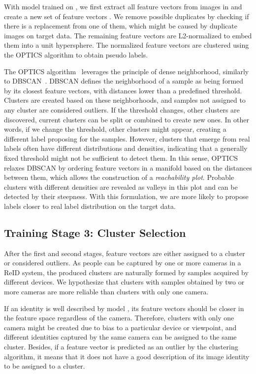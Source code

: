 \documentclass[journal]{IEEEtran}
\begin{document}
With model  trained on , we first extract all feature vectors from images in  and create a new set of feature vectors .
We remove possible duplicates by checking if there is a replacement from one of them, which might be caused by duplicate images on target data. The remaining feature vectors are L2-normalized to embed them into a unit hypersphere. The normalized feature vectors are clustered using the OPTICS algorithm to obtain pseudo labels. 

The OPTICS algorithm~\cite{ankerst1999optics} leverages the principle of dense neighborhood, similarly to DBSCAN~\cite{ester1996density}. DBSCAN defines the neighborhood of a sample as being formed by its closest feature vectors, with distances lower than a predefined threshold. Clusters are created based on these neighborhoods, and samples not assigned to any cluster are considered outliers. If the threshold changes, other clusters are discovered, current clusters can be split or combined to create new ones.  In other words, if we change the threshold, other clusters might appear, creating a different label proposing for the samples. However, clusters that emerge from real labels often have different distributions and densities, indicating that a generally fixed threshold might not be sufficient to detect them. In this sense, OPTICS relaxes DBSCAN by ordering feature vectors in a manifold based on the distances between them, which allows the construction of a \textit{reachability plot}. Probable clusters with different densities are revealed as valleys in this plot and can be detected by their steepness. With this formulation, we are more likely to propose labels closer to real label distribution on the target data.



\subsection{Training Stage 3: Cluster Selection}
\label{subsec:cluster_selection}

After the first and second stages, feature vectors are either assigned to a cluster or considered outliers. As people can be captured by one or more cameras in a ReID system, the produced clusters are naturally formed by samples acquired by different devices. We hypothesize that clusters with samples obtained by two or more cameras are more reliable than clusters with only one camera. 

If an identity is well described by model , its feature vectors should be closer in the feature space regardless of the camera. Therefore, clusters with only one camera might be created due to bias to a particular device or viewpoint, and different identities captured by the same camera can be assigned to the same cluster. Besides, if a feature vector is predicted as an outlier by the clustering algorithm, it means that it does not have a good description of its image identity to be assigned to a cluster.
\end{document}
